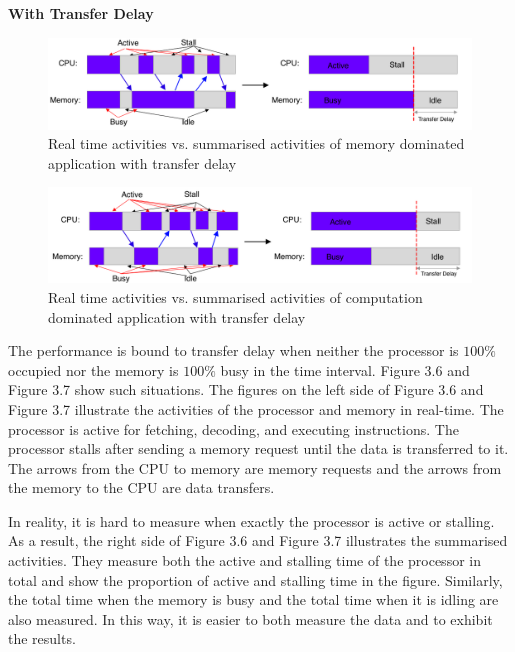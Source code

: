 \textbf{With Transfer Delay}
\begin{figure} [h] %
	\centering   %
	\includegraphics[width=16cm]{pictures/fig3.10}
	\caption{Real time activities vs. summarised activities of memory dominated application with transfer delay}
	\label{fig3.10}  %
\end{figure}
\begin{figure} [h] %
	\centering   %
	\includegraphics[width=16cm]{pictures/fig3.11}
	\caption{Real time activities vs. summarised activities of computation dominated application with transfer delay}
	\label{fig3.11}  %
\end{figure}

The performance is bound to transfer delay when neither the processor is $100\%$ occupied nor the memory is $100\%$ busy in the time interval. Figure 3.6 and Figure 3.7 show such situations. The figures on the left side of Figure 3.6 and Figure 3.7 illustrate the activities of the processor and memory in real-time. The processor is active for fetching, decoding, and executing instructions. The processor stalls after sending a memory request until the data is transferred to it. The arrows from the CPU to memory are memory requests and the arrows from the memory to the CPU are data transfers. 

In reality, it is hard to measure when exactly the processor is active or stalling. As a result, the right side of Figure 3.6 and Figure 3.7 illustrates the summarised activities. They measure both the active and stalling time of the processor in total and show the proportion of active and stalling time in the figure. Similarly, the total time when the memory is busy and the total time when it is idling are also measured. In this way, it is easier to both measure the data and to exhibit the results. 

